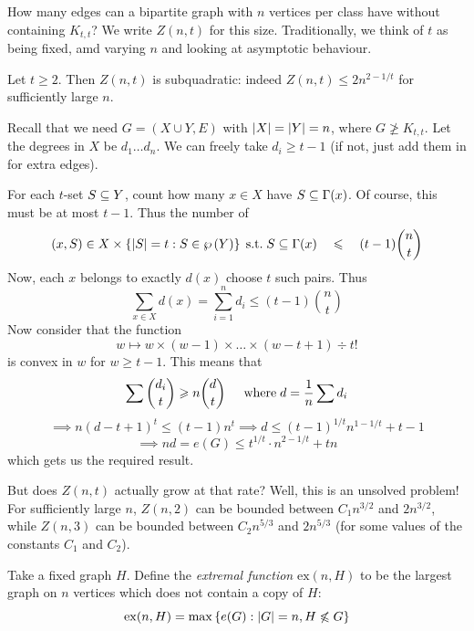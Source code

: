 \documentclass{article}
\begin{document}
\begin{example}
    \label{problem-of-zarankiewicz-example}
    How many edges can a bipartite graph with $n$ vertices per class have without containing $K_{t,t}$? We write $Z(n, t)$ for this size. Traditionally, we think of $t$ as being fixed, amd varying $n$ and looking at asymptotic behaviour.
\end{example}

\begin{theorem}
    \label{problem-of-zarankiewicz-theorem}
    Let $t \geq 2$. Then $Z(n, t)$ is subquadratic: indeed $Z(n, t) \leq 2n^{2-1/t}$ for sufficiently large $n$.
\end{theorem}

\begin{prf}
    Recall that we need $G = (X \cup Y, E)$ with $\left\lvert X \right\rvert = \left\lvert Y \right\rvert = n$, where $G \not\geq K_{t,t}$. Let the degrees in $X$ be $d_1 \dots d_n$. We can freely take $d_i \geq t-1$ (if not, just add them in for extra edges).
    
    For each $t$-set $S \subseteq Y$, count how many $x \in X$ have $S \subseteq \Gamma(x)$. Of course, this must be at most $t-1$. Thus the number of
    \[
	(x, S) \in X \times \left\lbrace \left\lvert S \right\rvert = t: S \in \wp\left(Y\right) \right\rbrace \mathrel{\, \text{s.t.}} S \subseteq \Gamma(x) \quad \leqslant \quad (t-1) {n \choose t}
	\]
	Now, each $x$ belongs to exactly $d(x)$ choose $t$ such pairs. Thus
	\[
	\sum_{x \in X} d(x) = \sum_{i = 1}^n d_i \leq (t-1) {n \choose t}
	\]
	Now consider that the function
	\[
	w \mapsto w \times (w - 1) \times \dots \times (w - t + 1) \div t!
	\]
	is convex in $w$ for $w \geq t-1$. This means that
	\[
	\sum {d_i \choose t} \geqslant n {d \choose t} \quad \mathrel{\, \text{where}} d = \frac{1}{n} \sum d_i
	\]
	\[
	\implies n(d- t + 1)^t \leq (t-1) n^t \implies d \leq (t-1)^{1/t} n^{1-1/t} + t - 1
	\]
	\[
	\implies nd = e(G) \leq t^{1/t} \cdot n^{2-1/t} + tn
	\]
	which gets us the required result.
\end{prf}

But does $Z(n, t)$ actually grow at that rate? Well, this is an unsolved problem! For sufficiently large $n$, $Z(n, 2)$ can be bounded between $C_1 n^{3/2}$ and $2 n^{3/2}$, while $Z(n, 3)$ can be bounded between $C_2 n^{5/3}$ and $2 n^{5/3}$ (for some values of the constants $C_1$ and $C_2$).

\begin{definition}
    Take a fixed graph $H$. Define the \textit{extremal function} $\mathrm{ex}(n, H)$ to be the largest graph on $n$ vertices which does not contain a copy of $H$:
    \[
	\mathrm{ex}(n, H) = \max \left\lbrace e(G): \left\lvert G \right\rvert = n, H \not\leqslant G \right\rbrace
	\]
\end{definition}
\end{document}
